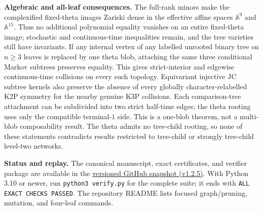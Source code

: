 \documentclass[10pt]{article}
\begin{document}
\textbf{Algebraic and all-leaf consequences.} The full-rank minors make the complexified fixed-theta images Zariski dense in the effective affine spaces $\mathbb A^9$ and $\mathbb A^{15}$. Thus no additional polynomial equality vanishes on an entire fixed-theta image; stochastic and continuous-time inequalities remain, and the tree varieties still have invariants. If any internal vertex of any labelled unrooted binary tree on $n\ge3$ leaves is replaced by one theta blob, attaching the same three conditional Markov subtrees preserves equality. This gives strict-interior and edgewise continuous-time collisions on every such topology. Equivariant injective JC subtree kernels also preserve the absence of every globally character-relabelled K2P symmetry for the nearby genuine K3P collisions. Each comparison-tree attachment can be subdivided into two strict half-time edges; the theta rooting uses only the compatible terminal-$1$ side. This is a one-blob theorem, not a multi-blob composability result. The theta admits no tree-child rooting, so none of these statements contradicts results restricted to tree-child or strongly tree-child level-two networks.

\textbf{Status and replay.} The canonical manuscript, exact certificates, and verifier package are available in the \href{https://github.com/AlecKriebel/Math/tree/k2p-k3p-theta-v1.2.5/k2p_k3p_theta_trinet_collision/k2p_k3p_theta_clarified}{versioned GitHub snapshot (v1.2.5)}. With Python 3.10 or newer, run \texttt{python3 verify.py} for the complete suite; it ends with \texttt{ALL EXACT CHECKS PASSED}. The repository README lists focused graph/pruning, mutation, and four-leaf commands.
\end{document}
